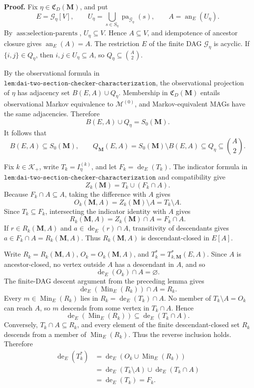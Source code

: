\textbf{Proof.}
Fix \(\eta\in\mathfrak C_D(\mathbf M)\), and put
\[
E=\mathcal G_\eta[V],
\qquad
U_\eta=\bigcup_{s\in S_\eta}\operatorname{pa}_{\mathcal G_\eta}(s),
\qquad
A=\operatorname{an}_E(U_\eta).
\]
By \(\operatorname{ass{:}selection\text{-}parents}\), \(U_\eta\subseteq V\).  Hence \(A\subseteq V\), and idempotence of ancestor closure gives \(\operatorname{an}_E(A)=A\).  The restriction \(E\) of the finite DAG \(\mathcal G_\eta\) is acyclic.  If \(\{i,j\}\in Q_\eta\), then \(i,j\in U_\eta\subseteq A\), so \(Q_\eta\subseteq\binom A2\).

By the observational formula in \(\texttt{lem:dai-two-section-checker-characterization}\), the observational projection of \(\eta\) has adjacency set \(B(E,A)\cup Q_\eta\).  Membership in \(\mathfrak C_D(\mathbf M)\) entails observational Markov equivalence to \(\mathcal M^{(0)}\), and Markov-equivalent MAGs have the same adjacencies.  Therefore
\[
B(E,A)\cup Q_\eta=S_0(\mathbf M).
\]
It follows that
\[
B(E,A)\subseteq S_0(\mathbf M),
\qquad
Q_{\mathbf M}(E,A)
=S_0(\mathbf M)\setminus B(E,A)
\subseteq Q_\eta
\subseteq\binom A2.
\]

Fix \(k\in\mathcal K_+\), write \(T_k=I_\eta^{(k)}\), and let \(F_k=\operatorname{de}_E(T_k)\).  The indicator formula in \(\texttt{lem:dai-two-section-checker-characterization}\) and compatibility give
\[
Z_k(\mathbf M)=T_k\cup(F_k\cap A).
\]
Because \(F_k\cap A\subseteq A\), taking the difference with \(A\) gives
\[
O_k(\mathbf M,A)=Z_k(\mathbf M)\setminus A=T_k\setminus A.
\]
Since \(T_k\subseteq F_k\), intersecting the indicator identity with \(A\) gives
\[
R_k(\mathbf M,A)=Z_k(\mathbf M)\cap A=F_k\cap A.
\]
If \(r\in R_k(\mathbf M,A)\) and \(a\in\operatorname{de}_E(r)\cap A\), transitivity of descendants gives \(a\in F_k\cap A=R_k(\mathbf M,A)\).  Thus \(R_k(\mathbf M,A)\) is descendant-closed in \(E[A]\).

Write \(R_k=R_k(\mathbf M,A)\), \(O_k=O_k(\mathbf M,A)\), and \(T_k^*=T^*_{k,\mathbf M}(E,A)\).  Since \(A\) is ancestor-closed, no vertex outside \(A\) has a descendant in \(A\), and so
\[
\operatorname{de}_E(O_k)\cap A=\varnothing.
\]
The finite-DAG descent argument from the preceding lemma gives
\[
\operatorname{de}_E(\operatorname{Min}_E(R_k))\cap A=R_k.
\]
Every \(m\in\operatorname{Min}_E(R_k)\) lies in \(R_k=\operatorname{de}_E(T_k)\cap A\).  No member of \(T_k\setminus A=O_k\) can reach \(A\), so \(m\) descends from some vertex in \(T_k\cap A\).  Hence
\[
\operatorname{de}_E(\operatorname{Min}_E(R_k))
\subseteq\operatorname{de}_E(T_k\cap A).
\]
Conversely, \(T_k\cap A\subseteq R_k\), and every element of the finite descendant-closed set \(R_k\) descends from a member of \(\operatorname{Min}_E(R_k)\).  Thus the reverse inclusion holds.  Therefore
\[
\begin{aligned}
\operatorname{de}_E(T_k^*)
&=\operatorname{de}_E(O_k\cup\operatorname{Min}_E(R_k))\\
&=\operatorname{de}_E(T_k\setminus A)\cup\operatorname{de}_E(T_k\cap A)\\
&=\operatorname{de}_E(T_k)=F_k.
\end{aligned}
\]

